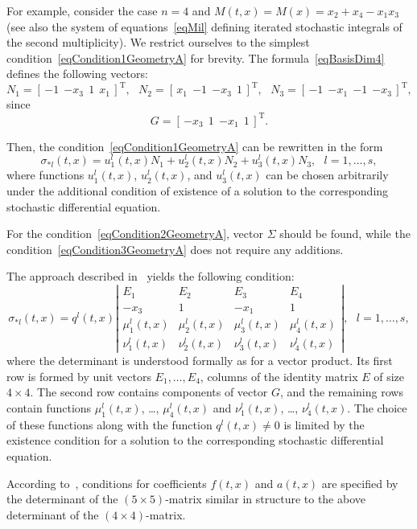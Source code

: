 \documentclass[10pt,reqno]{amsart}
\newcommand{\trans}{{\scriptscriptstyle \mathrm{T}}}
\theoremstyle{plain}
\theoremstyle{remark}
\begin{document}
For example, consider the case $n = 4$ and $M(t,x) = M(x) = x_2 + x_4 - x_1 x_3$ (see also the system of equations~\eqref{eqMil} defining iterated stochastic integrals of the second multiplicity). We restrict ourselves to the simplest condition~\eqref{eqCondition1GeometryA} for brevity. The formula~\eqref{eqBasisDim4} defines the following vectors:
\[
  N_1 = [ \, {-1} \ \ {-x_3} \ \ 1 \ \ x_1 \, ]^\trans, \ \ \
  N_2 = [ \, x_1 \ \ {-1} \ \ {-x_3} \ \ 1 \, ]^\trans, \ \ \
  N_3 = [ \, {-1} \ \ {-x_1} \ \ {-1} \ \ {-x_3} \, ]^\trans,
\]
since
\[
  G = [ \, {-x_3} \ \ 1 \ \ {-x_1} \ \ 1 \, ]^\trans.
\]

Then, the condition~\eqref{eqCondition1GeometryA} can be rewritten in the form
\[
  \sigma_{*l}(t,x) = u_1^l(t,x) N_1 + u_2^l(t,x) N_2 + u_3^l(t,x) N_3, \ \ \ l = 1,\dots,s,
\]
where functions $u_1^l(t,x)$, $u_2^l(t,x)$, and $u_3^l(t,x)$ can be chosen arbitrarily under the additional condition of existence of a solution to the corresponding stochastic differential equation.

For the condition~\eqref{eqCondition2GeometryA}, vector $\Sigma$ should be found, while the condition~\eqref{eqCondition3GeometryA} does not require any additions.

The approach described in~\cite{Dub_89, Kar_15, Kar_21} yields the following condition:
\[
  \sigma_{*l}(t,x) = q^l(t,x) \left|
    \begin{array}{cccc}
      E_1 & E_2 & E_3 & E_4 \\
      {-x_3} & 1 & {-x_1} & 1 \\
      \mu_1^l(t,x) & \mu_2^l(t,x) & \mu_3^l(t,x) & \mu_4^l(t,x) \\
      \nu_1^l(t,x) & \nu_2^l(t,x) & \nu_3^l(t,x) & \nu_4^l(t,x)
    \end{array}
  \right|, \ \ \ l = 1,\dots,s,
\]
where the determinant is understood formally as for a vector product. Its first row is formed by unit vectors $E_1,\dots,E_4$, columns of the identity matrix $E$ of size $4 \times 4$. The second row contains components of vector $G$, and the remaining rows contain functions $\mu_1^l(t,x)$, \dots, $\mu_4^l(t,x)$ and $\nu_1^l(t,x)$, \dots, $\nu_4^l(t,x)$. The choice of these functions along with the function $q^l(t,x) \neq 0$ is limited by the existence condition for a solution to the corresponding stochastic differential equation.

According to~\cite{Dub_89, Kar_15, Kar_21}, conditions for coefficients $f(t,x)$ and $a(t,x)$ are specified by the determinant of the $(5 \times 5)$-matrix similar in structure to the above determinant of the $(4 \times 4)$-matrix.
\end{document}

